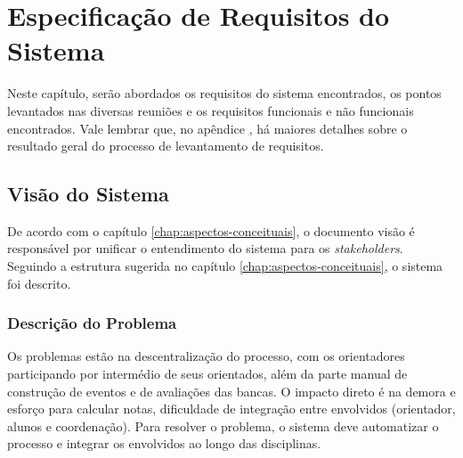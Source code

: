 \chapter{Especificação de Requisitos do Sistema}\label{chap:especificacao-requisitos-sistema}
Neste capítulo, serão abordados os requisitos do sistema encontrados, os pontos levantados nas diversas reuniões e os requisitos funcionais e não funcionais encontrados. Vale lembrar que, no apêndice \href{chap:vision-doc-appendix}, há maiores detalhes sobre o resultado geral do processo de levantamento de requisitos.

\section{Visão do Sistema}
De acordo com o capítulo \ref{chap:aspectos-conceituais}, o documento visão é responsável por unificar o entendimento do sistema para os \textit{stakeholders}. Seguindo a estrutura sugerida no capítulo \ref{chap:aspectos-conceituais}, o sistema foi descrito.

\subsection{Descrição do Problema}
Os problemas estão na descentralização do processo, com os orientadores participando por intermédio de seus orientados, além da parte manual de construção de eventos e de avaliações das bancas. O impacto direto é na demora e esforço para calcular notas, dificuldade de integração entre envolvidos (orientador, alunos e coordenação). Para resolver o problema, o sistema deve automatizar o processo e integrar os envolvidos ao longo das disciplinas.

